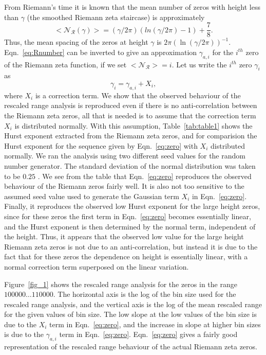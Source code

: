 \documentclass[11pt]{article}
\begin{document}
From Riemann's time it is known that the mean number of
zeros with height less than $\gamma$ (the smoothed Riemann zeta staircase)
is approximately~\cite{Edwards(1974),Berry(1986)}
\begin{equation}
<\mathcal{N_R} (\gamma)> = (\gamma/2\pi)(ln(\gamma/2\pi)-1)+\frac{7}{8}.
\label{eq:Rnumber}
\end{equation}
Thus, the mean spacing of the zeros at height $\gamma$ is
$2\pi(\ln (\gamma/2\pi))^{-1}$. Eqn.~\ref{eq:Rnumber} can be
inverted to give an
approximation $\gamma_{a,i}$ for the $i^{th}$ zero of the
Riemann zeta function, if we set $<\mathcal{N_R} >=i$.
Let us write the $i^{th}$ zero $\gamma_{i}$ as
\begin{equation}
\gamma_{i} = \gamma_{a,i}+X_{i},
\label{eq:zero}
\end{equation}
where $X_{i}$ is a correction term. We show that the observed
behaviour of the rescaled range analysis is reproduced even if
there is no anti-correlation between the Riemann zeta zeros,
all that is needed is to assume that the correction term $X_{i}$
is distributed normally. With this assumption, Table~\ref{tab:table1}
shows the Hurst exponent extracted from the Riemann zeta zeros,
and for comparision the Hurst exponent for the sequence
given by Eqn.~\ref{eq:zero} with $X_{i}$ distributed normally.
We ran the analysis using
two different seed values for the random number generator.
The standard deviation of the
normal distribution was taken to be $0.25$ .
We see from the table that Eqn.~\ref{eq:zero}
reproduces the observed behaviour of the Riemann zeros fairly
well. It is also not too sensitive to the assumed seed value used
to generate the Gaussian term $X_{i}$ in Eqn.~\ref{eq:zero}.
Finally, it reproduces the observed low Hurst exponent for the
large height zeros, since for these zeros the first term
in Eqn.~\ref{eq:zero} becomes essentially linear, and the
Hurst exponent is then determined by the normal term, independent of the
height. Thus, it appears that the observed low value for the large
height Riemann zeta zeros is not due to an anti-correlation, but
instead it is due to the fact that for these zeros the
dependence on height is essentially linear, with a normal correction
term superposed on the linear variation.

Figure~\ref{fig_1} shows the
rescaled range analysis for
the zeros  in the range $100000 \ldots 110000$.
The horizontal
axis is the log of the bin size used for the rescaled range analysis,
and the
vertical axis is the log of the mean rescaled
range for the given values of bin size. The low slope
at the low values of the bin size is due to the
$X_{i}$ term in Eqn.~\ref{eq:zero}, and the increase in
slope at higher bin sizes is due to the
$\gamma_{a,i}$ term in Eqn.~\ref{eq:zero}. Eqn.~\ref{eq:zero}
gives a fairly good representation of the rescaled
range behaviour of the actual Riemann zeta zeros.
\end{document}
